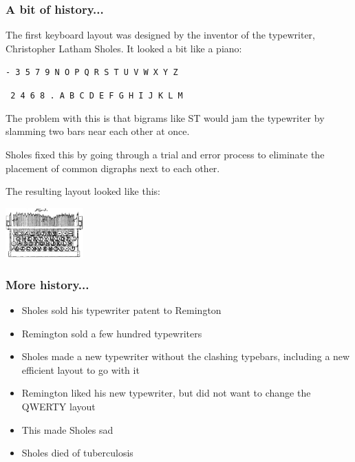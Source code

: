 \documentclass{beamer}
\begin{document}
\begin{frame}
    \frametitle{A bit of history...}
    \pause
    The first keyboard layout was designed by the inventor of the
    typewriter, Christopher Latham Sholes. It looked a bit like a piano:\par
    \medskip
    \hskip30pt\texttt{- 3 5 7 9 N O P Q R S T U V W X Y Z}\par
    \hskip30pt\texttt{ 2 4 6 8 . A B C D E F G H I J K L M}

    \medskip
    \pause
    The problem with this is that bigrams like ST would jam the
    typewriter by slamming two bars near each other at once.

    \smallskip
    \pause
    Sholes fixed this by going through a trial and error process to eliminate
    the placement of common digraphs next to each other.

    \smallskip
    \pause
    The resulting layout looked like this:\par
    \begin{center}
    \includegraphics[width=3cm]{graphics/1878sholes}
    \end{center}
\end{frame}

\begin{frame}
    \frametitle{More history...}
    \begin{itemize}[<+->]
        \item Sholes sold his typewriter patent to Remington
        \item Remington sold a few hundred typewriters
        \item Sholes made a new typewriter without the clashing typebars,
            including a new efficient layout to go with it
        \item Remington liked his new typewriter, but did not want to change
            the QWERTY layout
        \item This made Sholes sad
        \item Sholes died of tuberculosis
    \end{itemize}
\end{frame}
\end{document}
